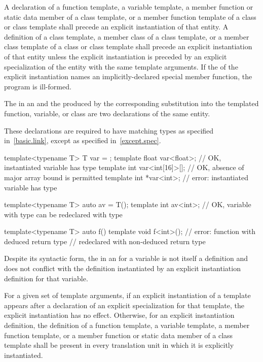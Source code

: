 \pnum
A declaration of a function template, a variable template, a member function
or static data member
of a class template, or a member function template of a class or class
template shall precede an explicit instantiation of that entity. A definition
of a class template, a member class of a class template, or a member class
template of a class or class template shall precede an explicit instantiation
of that entity unless the explicit instantiation is preceded by an explicit
specialization of the entity with the same template arguments.
If the
of the explicit instantiation names an implicitly-declared special member
function, the program is ill-formed.

\pnum
The  in an  and
the  produced by the corresponding substitution
into the templated function, variable, or class
are two declarations of the same entity.
\begin{note}
These declarations are required to have matching types as specified in~\ref{basic.link}, except as specified in~\ref{except.spec}.
\begin{example}
\begin{codeblock}
template<typename T> T var = {};
template float var<float>;      // OK, instantiated variable has type 
template int var<int[16]>[];    // OK, absence of major array bound is permitted
template int *var<int>;         // error: instantiated variable has type 

template<typename T> auto av = T();
template int av<int>;           // OK, variable with type  can be redeclared with type 

template<typename T> auto f() {}
template void f<int>();         // error: function with deduced return type
                                // redeclared with non-deduced return type
\end{codeblock}
\end{example}
\end{note}
Despite its syntactic form, the  in an  for a variable is not itself a definition and does not conflict with the definition instantiated by an explicit instantiation definition for that variable.

\pnum
For a given set of template arguments, if an explicit
instantiation of a template appears after a declaration of
an explicit specialization for that template, the explicit
instantiation has no effect. Otherwise, for an explicit instantiation
definition, the definition of a
function template, a variable template, a member
function template, or a member function or static
data member of a class template shall be present in every
translation unit in which it is explicitly instantiated.

